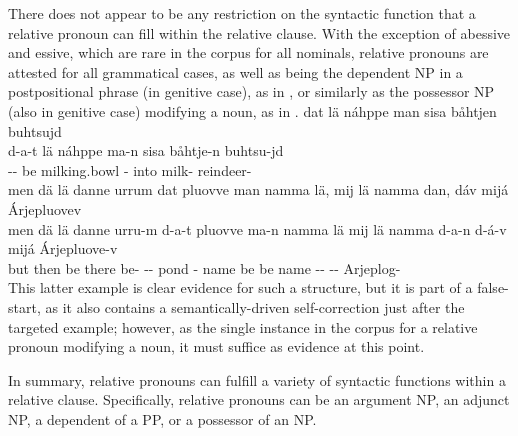 There does not appear to be any restriction on the syntactic function that a relative pronoun can fill within the relative clause. With the exception of abessive and essive, which are rare in the corpus for all nominals, relative pronouns are attested for all grammatical cases, as well as being the dependent NP in a postpositional phrase (in genitive case), as in , or similarly as the possessor NP (also in genitive case) modifying a noun, as in . 
\ea\label{relClause7}%
\glll	dat lä náhppe man sisa båhtjen buhtsujd\\
	d-a-t lä náhppe ma-n sisa båhtje-n buhtsu-jd\\
	-- be\BS{} milking.bowl\BS{} - into milk- reindeer-\\\nopagebreak
{} 
\z
\ea\label{relClause8}%
\glll	men dä lä danne urrum dat pluovve man namma lä, mij lä namma dan, dáv mijá Árjepluovev\\
	men dä lä danne urru-m d-a-t pluovve ma-n namma lä mij lä namma d-a-n d-á-v mijá Árjepluove-v\\
	but then be\BS{} there be- -- pond\BS{} - name\BS{} be\BS{} \BS{} be\BS{} name\BS{} -- --  Arjeplog-\\\nopagebreak
{} 
\z
This latter example is clear evidence for such a structure, but it is part of a false-start, as it also contains a semantically-driven self-correction just after the targeted example; however, as the single instance in the corpus for a relative pronoun modifying a noun, it must suffice as evidence at this point. %


In summary, relative pronouns can fulfill a variety of syntactic functions within a relative clause. Specifically, relative pronouns can be  
an argument NP, 
an adjunct NP, 
a dependent of a PP, or 
a possessor of an NP.




%
